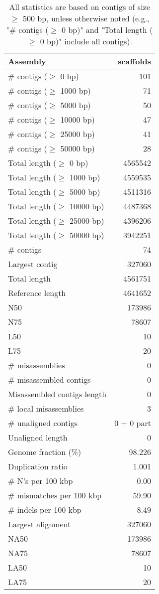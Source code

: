 \documentclass[12pt,a4paper]{article}
\begin{document}
\begin{table}[ht]
\begin{center}
\caption{All statistics are based on contigs of size $\geq$ 500 bp, unless otherwise noted (e.g., "\# contigs ($\geq$ 0 bp)" and "Total length ($\geq$ 0 bp)" include all contigs).}
\begin{tabular}{|l*{1}{|r}|}
\hline
Assembly & scaffolds \\ \hline
\# contigs ($\geq$ 0 bp) & 101 \\ \hline
\# contigs ($\geq$ 1000 bp) & 71 \\ \hline
\# contigs ($\geq$ 5000 bp) & 50 \\ \hline
\# contigs ($\geq$ 10000 bp) & 47 \\ \hline
\# contigs ($\geq$ 25000 bp) & 41 \\ \hline
\# contigs ($\geq$ 50000 bp) & 28 \\ \hline
Total length ($\geq$ 0 bp) & 4565542 \\ \hline
Total length ($\geq$ 1000 bp) & 4559535 \\ \hline
Total length ($\geq$ 5000 bp) & 4511316 \\ \hline
Total length ($\geq$ 10000 bp) & 4487368 \\ \hline
Total length ($\geq$ 25000 bp) & 4396206 \\ \hline
Total length ($\geq$ 50000 bp) & 3942251 \\ \hline
\# contigs & 74 \\ \hline
Largest contig & 327060 \\ \hline
Total length & 4561751 \\ \hline
Reference length & 4641652 \\ \hline
N50 & 173986 \\ \hline
N75 & 78607 \\ \hline
L50 & 10 \\ \hline
L75 & 20 \\ \hline
\# misassemblies & 0 \\ \hline
\# misassembled contigs & 0 \\ \hline
Misassembled contigs length & 0 \\ \hline
\# local misassemblies & 3 \\ \hline
\# unaligned contigs & 0 + 0 part \\ \hline
Unaligned length & 0 \\ \hline
Genome fraction (\%) & 98.226 \\ \hline
Duplication ratio & 1.001 \\ \hline
\# N's per 100 kbp & 0.00 \\ \hline
\# mismatches per 100 kbp & 59.90 \\ \hline
\# indels per 100 kbp & 8.49 \\ \hline
Largest alignment & 327060 \\ \hline
NA50 & 173986 \\ \hline
NA75 & 78607 \\ \hline
LA50 & 10 \\ \hline
LA75 & 20 \\ \hline
\end{tabular}
\end{center}
\end{table}
\end{document}
